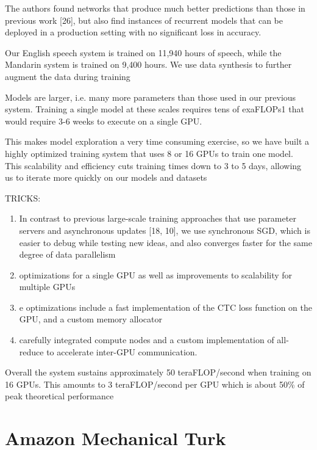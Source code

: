 The authors found networks that produce much better predictions than those in previous
work [26], but also find instances of recurrent models that can be deployed in a
production setting with no significant loss in accuracy.

\begin{mdframed}

Our English speech system
is trained on 11,940 hours of speech, while the Mandarin system is trained on 9,400 hours. We use
data synthesis to further augment the data during training

Models are larger, i.e. many more parameters than those used in our previous
system. Training a single model at these scales requires tens of exaFLOPs1 that
would require 3-6 weeks to execute on a single GPU.

This makes model exploration a very time consuming exercise, so we have built a
highly optimized training system that uses 8 or 16 GPUs to train one model. 
This scalability and efficiency cuts training times down to 3 to 5 days,
allowing us to iterate more quickly on our models and datasets

TRICKS:
\begin{enumerate}

  \item  In contrast to previous large-scale training
approaches that use parameter servers and asynchronous updates [18, 10], we use
synchronous SGD, which is easier to debug while testing new ideas, and also
converges faster for the same degree of data parallelism
  
  \item optimizations for a single GPU
as well as improvements to scalability for multiple GPUs

  \item e optimizations include a fast implementation of the CTC loss function
  on the GPU, and a custom memory allocator

  \item carefully integrated compute nodes and a custom implementation of all-reduce to accelerate
inter-GPU communication.

\end{enumerate}
Overall the system sustains approximately 50 teraFLOP/second when
training on 16 GPUs. This amounts to 3 teraFLOP/second per GPU which is about 50\% of peak
theoretical performance

\end{mdframed}


\section{Amazon Mechanical Turk}

